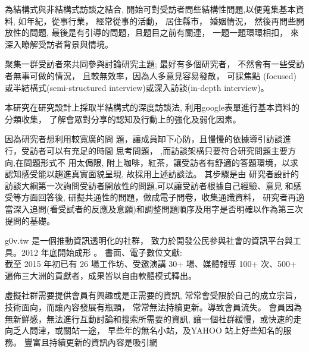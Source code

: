 為結構式與非結構式訪談之結合,
開始可對受訪者問些結構性問題,以便蒐集基本資料,
如年紀，從事行業，
經常從事的活動，
居住縣市，
婚姻情況，
然後再問些開放性的問題,
最後是有引導的問題，且題目之前有關連，
一題一題環環相扣，
來
深入瞭解受訪者背景與情境。

聚集一群受訪者來共同參與討論研究主題;
最好有多個研究者，
不然會有一些受訪者無事可做的情況，
且較無效率，因為人多意見容易發散，
可採焦點
(focused)或半結構式(semi-structured interview)或深入訪談(in-depth interview)。


本研究在研究設計上採取半結構式的深度訪談法,
利用google表單進行基本資料的分類收集，
了解會眾對分享的認知及行動上的強化及弱化因素。

因為研究者想利用較寬廣的問
題，讓成員缷下心防，且慢慢的依據導引訪談進行，受訪者可以有充足的時間
思考問題，
,而訪談架構只要符合研究問題主要方向,在問題形式不
用太侷限, 附上咖啡，紅茶，讓受訪者有舒適的答題環境，以求認知感受能以趨進真實面貌呈現,
故採用上述訪談法。
其步驟是由
研究者設計的訪談大綱第一次詢問受訪者開放性的問題,可以讓受訪者根據自己經驗、意見
和感受等方面回答後,
研擬共通性的問題，做成電子問卷，收集通識資料，
研究者再適當深入追問(看受試者的反應及意願)和調整問題順序及用字是否明確以作為第三次提問的基礎。




g0v.tw 是一個推動資訊透明化的社群，
致力於開發公民參與社會的資訊平台與工具。2012 年底開始成形
。
書面、電子數位文獻: \\
截至 2015 年初已有 26 場工作坊、受邀演講 30+ 場、媒體報導 100+ 次、500+ 遍佈三大洲的貢獻者，成果皆以自由軟體模式釋出。








虛擬社群需要提供會員有興趣或是正需要的資訊,
常常會受限於自己的成立宗旨，技術面向，而讓內容發展有瓶頸，
常常無法持續更新。導致會員流失。
會員因為無新鮮感，無法進行互動討論和搜索所需要的資訊,
讓一個社群緩慢，或快速的走向乏人問津，或關站一途，
早些年的無名小站，及YAHOO 站上好些知名的服務。
豐富且持續更新的資訊內容是吸引網



